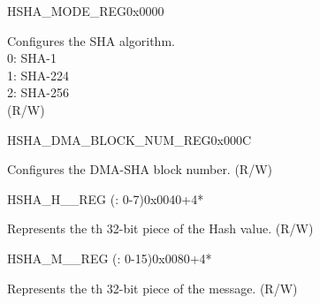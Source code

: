 \begin{register}{H}{SHA\_MODE\_REG}{0x0000}\label{regdesc:SHAMODEREG}
%
%
\regnewline%
\begin{regdesc}\begin{reglist}
\label{fielddesc:SHAMODE}\item [SHA\_MODE] Configures the SHA algorithm. \\
0: SHA-1\\
1: SHA-224\\
2: SHA-256\\
(R/W)
\end{reglist}\end{regdesc}
\end{register}

\begin{register}{H}{SHA\_DMA\_BLOCK\_NUM\_REG}{0x000C}\label{regdesc:SHADMABLOCKNUMREG}
%
%
\regnewline%
\begin{regdesc}\begin{reglist}
\label{fielddesc:SHADMABLOCKNUM}\item [SHA\_DMA\_BLOCK\_NUM] Configures the DMA-SHA block number. (R/W)
\end{reglist}\end{regdesc}
\end{register}

\begin{register}{H}{SHA\_H\_\_REG (: 0-7)}{0x0040+4*}\label{regdesc:SHAHNREG}
%
\regnewline%
\begin{regdesc}\begin{reglist}
\label{fielddesc:SHAH0}\item [SHA\_H\_\regindex{n}] Represents the th 32-bit piece of the Hash value. (R/W)
\end{reglist}\end{regdesc}
\end{register}

\begin{register}{H}{SHA\_M\_\_REG (: 0-15)}{0x0080+4*}\label{regdesc:SHAMNREG}
%
\regnewline%
\begin{regdesc}\begin{reglist}
\label{fielddesc:SHAM0}\item [SHA\_M\_\regindex{n}] Represents the th 32-bit piece of the message. (R/W)
\end{reglist}\end{regdesc}
\end{register}
